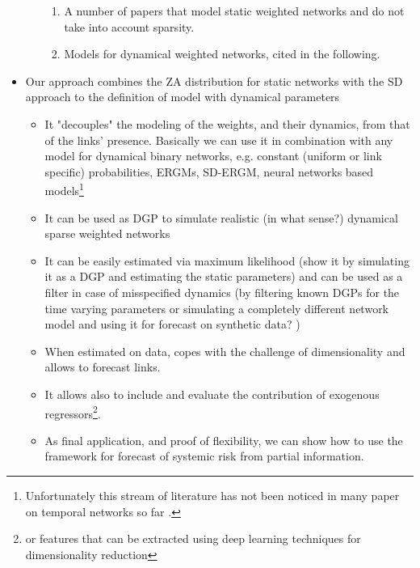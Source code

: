 \documentclass[a4paper,12pt]{article}
\begin{document}
\begin{itemize}
\begin{itemize}
{\begin{enumerate}
				\item A number of papers that model static weighted networks and do not take into account sparsity.
				\item Models for dynamical weighted networks, cited in the following. 
		\end{enumerate}	}		
	\end{itemize} 
	\item Our approach combines the ZA distribution for static networks with the SD approach to the definition of model with dynamical parameters    
		\begin{itemize}
			\item It "decouples" the modeling of the weights, and their dynamics, from that of the links' presence. Basically we can use it in combination with any model for dynamical binary networks, e.g. constant (uniform or link specific) probabilities, ERGMs, SD-ERGM, neural networks based models\footnote{Unfortunately this stream of literature has not been noticed in many paper on temporal networks so far \citep[see, for example][]{perozzi2014deepwalk,trivedi2018representation,goyal2018dyngem,goyal2019dyngraph2vec,singer2019node}. }
			\item It can be used as DGP to simulate realistic (in what sense?) dynamical sparse weighted networks
			\item It can be easily estimated via maximum likelihood  (show it by simulating it as a DGP and estimating the static parameters)  and can be used as a filter in case of misspecified dynamics (by filtering known DGPs for the time varying parameters or simulating a completely different network model and using it for forecast on synthetic data? )
			\item When estimated on data,  copes with the challenge of dimensionality and allows to forecast links.
			\item It allows also to include and evaluate the contribution of exogenous regressors\footnote{or features that can be extracted using deep learning techniques for dimensionality reduction}. 
			\item As final application, and proof of flexibility, we can show how to use the framework for forecast of systemic risk from partial information. 
			
		\end{itemize}
 
	
\end{itemize}
\end{document}
